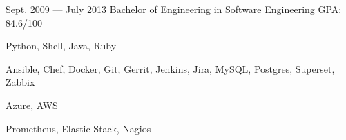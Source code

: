 \documentclass{resume}
\begin{document}
\begin{body}
	{Sept. 2009 --- July 2013}
	{Bachelor of Engineering in Software Engineering}
	{GPA: 84.6/100}
\end{body}

\smallskip


\begin{body}
\begin{description}[style=nextline,leftmargin=8em,topsep=1pt]
	\item[Languages] Python, Shell, Java, Ruby
	\item[Tools] Ansible, Chef, Docker, Git, Gerrit, Jenkins, Jira, MySQL, Postgres, Superset, Zabbix
	\item[Cloud] Azure, AWS
	\item[Monitoring] Prometheus, Elastic Stack, Nagios
\end{description}
\end{body}






%
\end{document}
